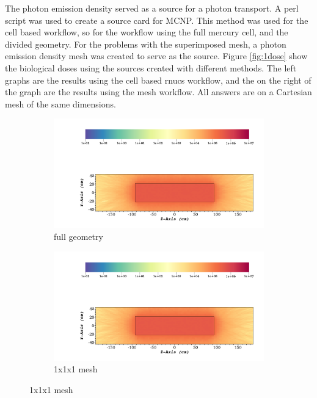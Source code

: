 %
The photon emission density served as a source for a photon transport. A perl
script was used to create a source card for MCNP. This method was used for the
cell based workflow, so for the workflow using the full mercury cell, and the
divided geometry. For the problems with the superimposed mesh, a photon
emission density mesh was created to serve as the source.
Figure \ref{fig:1dose} show the biological doses using the sources created with
different methods. The left graphs are the results using the cell based rnucs
workflow, and the on the right of the graph are the results using the mesh
workflow. All answers are on a Cartesian mesh of the same dimensions.
\begin{figure}[H]
	\begin{subfigure}[t]{0.5\textwidth}
		\includegraphics[width=\linewidth, trim={5cm 1cm 2cm 16cm},clip]{../figs/toy_p1/dose_VPI_original.png}
		\caption{full geometry}
		\label{fig:1dose_orig}
	\end{subfigure}\hfill
	\begin{subfigure}[t]{0.5\textwidth}
		\includegraphics[width=\linewidth, trim={5cm 1cm 2cm 16cm},clip]{../figs/toy_p1/dose_VPI_1x_mesh.png}
		\caption{1x1x1 mesh}
		\label{fig:1dose_1x_mesh}
	\end{subfigure}


\end{figure}
